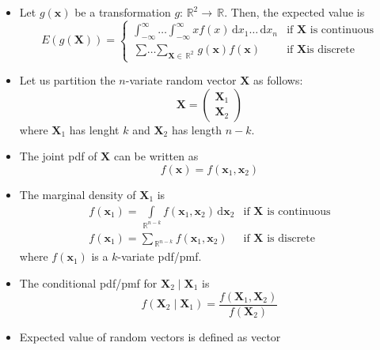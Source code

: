 \documentclass[10pt, twoside, a4paper]{book}
\newcommand{\ud}{\,\mathrm{d}}
\newcommand{\ureal}{\,\mathbb{R}}
\theoremstyle{definition}
\begin{document}
\begin{itemize}
\item Let $g(\bm x)$ be a transformation $g: \ureal^2 \to \ureal$. Then, the
	expected value is
	\begin{equation*}
	\renewcommand{\arraystretch}{1.6}
	E(g(\bm X)) = \left\{
	\begin{array}{ll}
	\int_{-\infty}^\infty \ldots \int_{-\infty}^\infty x f(x) \ud x_1 \ldots \ud
	x_n & \text{if $\bm X$ is continuous} \\
	\mathop{\sum\ldots\sum}_{\bm X \in \ureal^2}g(\bm x)f(\bm x)& \text{if $\bm X$
	is discrete} \end{array} \right.
	\end{equation*}
	\item Let us partition the $n$-variate random vector $\bm X$ as follows:
	$$\bm X = \left(\begin{matrix}\bm X_1 \\ \bm X_2\end{matrix}\right)$$
	where $\bm X_1$ has lenght $k$ and $\bm X_2$ has length $n-k$. 
	\item The joint pdf
	of $\bm X$ can be written as
	$$f(\bm x) = f(\bm x_1, \bm x_2)$$ 
	\item The marginal density of $\bm X_1$ is
	\begin{equation*}
	\renewcommand{\arraystretch}{1.6}
	\begin{array}{ll}
	f(\bm x_1) = \int\limits_{\ureal^{n-k}} f(\bm x_1, \bm x_2) \ud \bm x_2 &
	\text{if $\bm X$ is continuous} \\
	f(\bm x_1) = \sum\limits_{\ureal^{n-k}} f(\bm x_1, \bm x_2) &
	\text{if $\bm X$ is discrete}
	\end{array}
	\end{equation*}
	where $f(\bm x_1)$ is a $k$-variate pdf/pmf.
	
	
	\item The conditional pdf/pmf for $\bm X_2 \mid \bm X_1$ is
	$$f(\bm X_2 \mid \bm X_1) = \frac{f(\bm X_1, \bm X_2)}{f(\bm X_2)}$$
	
	
	\item Expected value of random vectors is defined as vector
	

\end{itemize}
\end{document}
